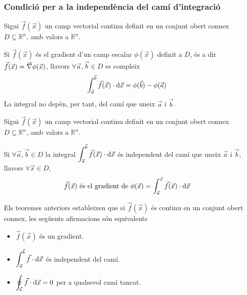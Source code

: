 \subsubsection*{Condició per a la independència del camí d'integració}
\begin{thm}
    Sigui $\vec{f}(\vec{x})$ un camp vectorial continu definit en un conjunt obert connex $D \subseteq \mathbb{R}^{n}$, amb valors a $\mathbb{R}^{n}$.
    
    Si $\vec{f}(\vec{x})$ és el gradient d'un camp escalar $\phi(\vec{x})$ definit a $D$, és a dir $\vec{f}(\vec{x}) = \vec{\nabla} \phi (\vec{x})$, llavors $\forall \vec{a}, \vec{b} \in D$ es compleix
    \begin{align}
        \int_{\vec{a}}^{\vec{b}} \vec{f}(\vec{x}) \cdot \mathrm{d} \vec{x} = \phi(\vec{b}) - \phi(\vec{a})
    \end{align}
    La integral no depèn, per tant, del camí que uneix $\vec{a}$ i $\vec{b}$.
\end{thm}
\begin{thm}
    Sigui $\vec{f}(\vec{x})$ un camp vectorial continu definit en un conjunt obert connex $D \subseteq \mathbb{R}^{n}$, amb valors a $\mathbb{R}^{n}$.
    
    Si $\forall \vec{a}, \vec{b} \in D$ la integral $\displaystyle \int_{\vec{a}}^{\vec{b}} \vec{f}(\vec{x}) \cdot \mathrm{d} \vec{x}$ és independent del camí que uneix $\vec{a}$ i $\vec{b}$, llavors $\forall \vec{x} \in D$, 
    \begin{align}
        \vec{f}(\vec{x}) \text{ és el gradient de } \phi(\vec{x}) = \int_{\vec{a}}^{\vec{x}} \vec{f}(\vec{x}) \cdot \mathrm{d} \vec{x}
    \end{align}
\end{thm}
\begin{cor}
Els teoremes anteriors estableixen que si $\vec{f}(\vec{x})$ és continu en un conjunt obert connex, les següents afirmacions són equivalents
\begin{itemize}
    \item $\vec{f}(\vec{x})$ és un gradient.
    \item $\displaystyle \int_{\vec{a}}^{\vec{b}} \vec{f} \cdot \mathrm{d} \vec{x}$ és independent del camí.
    \item $\displaystyle \oint_{\mathcal{C}} \vec{f} \cdot \mathrm{d} \vec{x} = 0$ per a qualsevol camí tancat.
\end{itemize}
\end{cor}

